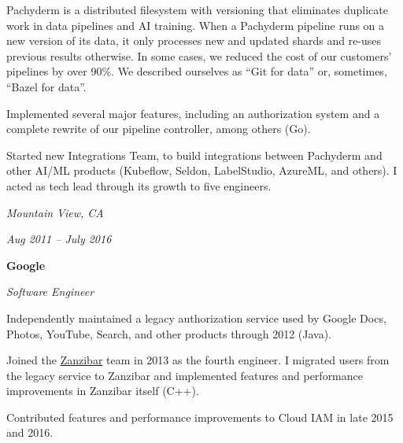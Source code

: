 \documentclass[10pt, letterpaper]{article}
\begin{document}
\vspace{0.1 cm}

\begin{onecolentry}
    \begin{highlights}
        \item Pachyderm is a distributed filesystem with versioning that eliminates duplicate work in data pipelines and AI training. When a Pachyderm pipeline runs on a new version of its data, it only processes new and updated shards and re-uses previous results otherwise. In some cases, we reduced the cost of our customers' pipelines by over 90\%. We described ourselves as ``Git for data'' or, sometimes, ``Bazel for data''.
        \item Implemented several major features, including an authorization system and a complete rewrite of our pipeline controller, among others (Go).
        \item Started new Integrations Team, to build integrations between Pachyderm and other AI/ML products (Kubeflow, Seldon, LabelStudio, AzureML, and others). I acted as tech lead through its growth to five engineers.
    \end{highlights}
  \end{onecolentry}

\vspace{0.2 cm}

\begin{twocolentry}{
    \textit{Mountain View, CA}

    \textit{Aug 2011 – July 2016}
}
    \textbf{Google}

    \textit{Software Engineer}
\end{twocolentry}

\vspace{0.1 cm}
\begin{onecolentry}
    \begin{highlights}
        \item Independently maintained a legacy authorization service used by Google Docs, Photos, YouTube, Search, and other products through 2012 (Java).
        \item Joined the \href{https://research.google/pubs/zanzibar-googles-consistent-global-authorization-system/}{Zanzibar} team in 2013 as the fourth engineer. I migrated users from the legacy service to Zanzibar and implemented features and performance improvements in Zanzibar itself (C++).
        \item Contributed features and performance improvements to Cloud IAM in late 2015 and 2016.
    \end{highlights}
\end{onecolentry}
\end{document}
